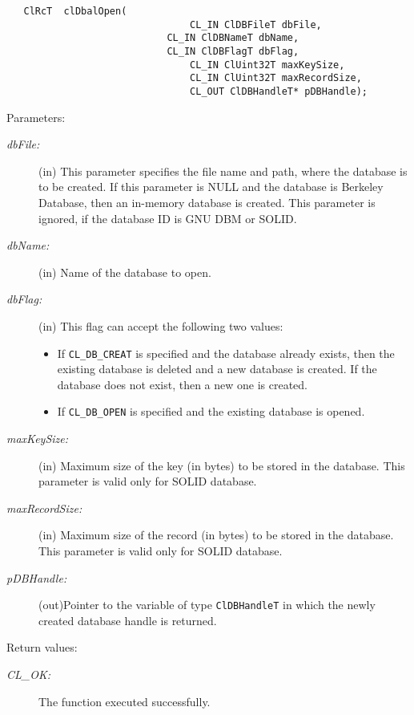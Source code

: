 \begin{flushleft}
\begin{Desc}
\footnotesize\begin{verbatim}   ClRcT  clDbalOpen(
                        		CL_IN ClDBFileT dbFile,
                			CL_IN ClDBNameT dbName,
                			CL_IN ClDBFlagT dbFlag,
                		        CL_IN ClUint32T maxKeySize,
                		        CL_IN ClUint32T maxRecordSize,
                		        CL_OUT ClDBHandleT* pDBHandle);
\end{verbatim}
\normalsize
\end{Desc}
\begin{Desc}
\item[Parameters:]
\begin{description}
\item[{\em db\-File:}](in) This parameter specifies the file name and path, where the database is to be created. If this parameter is NULL and the
database is Berkeley Database, then an in-memory database is created. This parameter is ignored, if the database ID is GNU DBM or SOLID.
\item[{\em db\-Name:}](in) Name of the database to open.
\item[{\em db\-Flag:}](in) This flag can accept the following two values: \begin{itemize}
\item If {\tt{CL\_\-DB\_\-CREAT}} is specified and the database already exists, then the existing database is deleted and a new database is created. 
If the database does not exist, then a new one is created. 
\item If {\tt{CL\_\-DB\_\-OPEN}} is specified and the existing database is opened.
\end{itemize}
\item[{\em max\-Key\-Size:}](in) Maximum size of the key (in bytes) to be stored in the database. This parameter is valid only for SOLID database.
\item[{\em max\-Record\-Size:}](in) Maximum size of the record (in bytes) to be stored in the database. This parameter is valid only for SOLID database.
\item[{\em p\-DBHandle:}](out)Pointer to the variable of type {\tt{Cl\-DBHandle\-T}} in which the newly created database handle is returned.
\end{description}
\end{Desc}
\begin{Desc}
\item[Return values:]
\begin{description}
\item[{\em CL\_\-OK:}]The function executed successfully. 

\end{description}
\end{Desc}
\end{flushleft}
